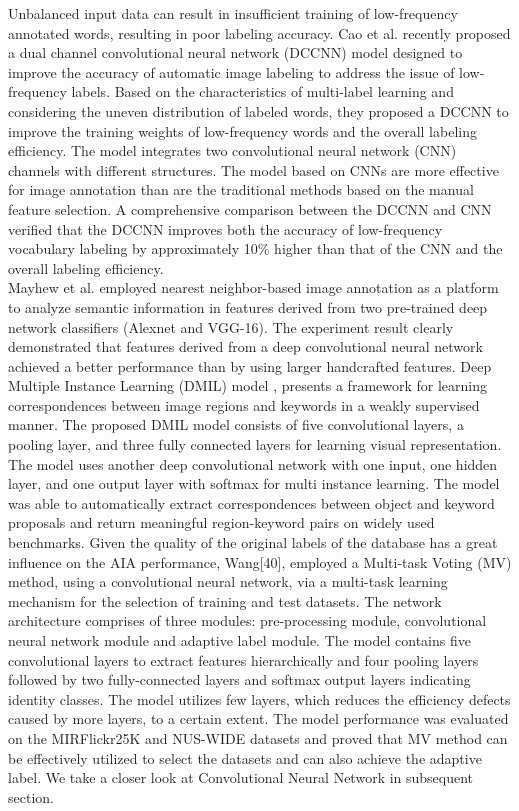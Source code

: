 \documentclass[conference]{IEEEtran}
\begin{document}
		Unbalanced input data can result in insufficient training of low-frequency annotated
words, resulting in poor labeling accuracy. Cao et al.\cite{Cao} recently proposed a dual channel convolutional neural network (DCCNN) model designed to improve the accuracy
of automatic image labeling to address the issue of low-frequency labels. Based on the
characteristics of multi-label learning and considering the uneven distribution of labeled
words, they proposed a DCCNN to improve the training weights of low-frequency words
and the overall labeling efficiency. The model integrates two convolutional neural network
(CNN) channels with different structures. The model based on CNNs are more effective for
image annotation than are the traditional methods based on the manual feature selection.
A comprehensive comparison between the DCCNN and CNN verified that the DCCNN
improves both the accuracy of low-frequency vocabulary labeling by approximately 10\%
higher than that of the CNN and the overall labeling efficiency.\\
		
		Mayhew et al.\cite{Mayhew} employed nearest neighbor-based image annotation as a platform to analyze semantic information in features derived from two
pre-trained deep network classifiers (Alexnet and VGG-16). The experiment result clearly
demonstrated that features derived from a deep convolutional neural network achieved
a better performance than by using larger handcrafted features. Deep Multiple Instance
Learning (DMIL) model \cite{Kai}, presents a framework for learning correspondences between image regions and keywords in a weakly supervised manner. The
proposed DMIL model consists of five convolutional layers, a pooling layer, and three fully connected layers for learning visual representation. The model uses another deep convolutional network with one input, one hidden layer, and one output layer with softmax for multi instance learning. The model was able to automatically extract correspondences
		between object and keyword proposals and return meaningful region-keyword pairs on widely used benchmarks. Given the quality of the original labels of the database has a great influence on the AIA performance, Wang[40], employed a Multi-task Voting (MV) method, using a convolutional neural network, via a multi-task learning mechanism for the selection of training and test datasets. The network architecture comprises of three modules:
pre-processing module, convolutional neural network module and adaptive label module. The model contains five convolutional layers to extract features hierarchically and four pooling layers followed by two fully-connected layers and softmax output layers indicating identity classes. The model utilizes few layers, which reduces the efficiency defects caused by more layers, to a certain extent. The model performance was evaluated on the MIRFlickr25K and NUS-WIDE datasets and proved that MV method can be effectively utilized to select the datasets and can also achieve the adaptive label. We take a closer look at Convolutional Neural Network in subsequent section.\\
		
\end{document}
